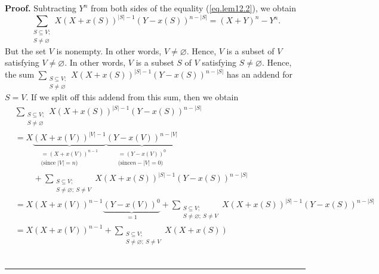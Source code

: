 \documentclass[numbers=enddot,12pt,final,onecolumn,notitlepage]{scrartcl}%
\theoremstyle{definition}
\newenvironment{proof}[1][Proof]{\noindent\textbf{#1.} }{\ \rule{0.5em}{0.5em}}
\let\sumnonlimits\sum
\renewcommand{\sum}{\sumnonlimits\limits}
\newenvironment{verlong}{}{}
\begin{document}
\begin{verlong}
\begin{proof}
Subtracting $Y^{n}$ from both sides of the equality (\ref{eq.lem12.2}), we
obtain%
\begin{equation}
\sum_{\substack{S\subseteq V;\\S\neq\varnothing}}X\left(  X+x\left(  S\right)
\right)  ^{\left\vert S\right\vert -1}\left(  Y-x\left(  S\right)  \right)
^{n-\left\vert S\right\vert }=\left(  X+Y\right)  ^{n}-Y^{n}.
\label{pf.lem.4.4}%
\end{equation}
But the set $V$ is nonempty. In other words, $V\neq\varnothing$. Hence, $V$ is
a subset of $V$ satisfying $V\neq\varnothing$. In other words, $V$ is a subset
$S$ of $V$ satisfying $S\neq\varnothing$. Hence, the sum $\sum
_{\substack{S\subseteq V;\\S\neq\varnothing}}X\left(  X+x\left(  S\right)
\right)  ^{\left\vert S\right\vert -1}\left(  Y-x\left(  S\right)  \right)
^{n-\left\vert S\right\vert }$ has an addend for $S=V$. If we split off this
addend from this sum, then we obtain%
\begin{align*}
&  \sum_{\substack{S\subseteq V;\\S\neq\varnothing}}X\left(  X+x\left(
S\right)  \right)  ^{\left\vert S\right\vert -1}\left(  Y-x\left(  S\right)
\right)  ^{n-\left\vert S\right\vert }\\
&  =X\underbrace{\left(  X+x\left(  V\right)  \right)  ^{\left\vert
V\right\vert -1}}_{\substack{=\left(  X+x\left(  V\right)  \right)
^{n-1}\\\text{(since }\left\vert V\right\vert =n\text{)}}}\underbrace{\left(
Y-x\left(  V\right)  \right)  ^{n-\left\vert V\right\vert }}%
_{\substack{=\left(  Y-x\left(  V\right)  \right)  ^{0}\\\text{(since
}n-\left\vert V\right\vert =0\text{)}}}\\
&  \ \ \ \ \ \ \ \ \ \ +\sum_{\substack{S\subseteq V;\\S\neq\varnothing
;\ S\neq V}}X\left(  X+x\left(  S\right)  \right)  ^{\left\vert S\right\vert
-1}\left(  Y-x\left(  S\right)  \right)  ^{n-\left\vert S\right\vert }\\
&  =X\left(  X+x\left(  V\right)  \right)  ^{n-1}\underbrace{\left(
Y-x\left(  V\right)  \right)  ^{0}}_{=1}+\sum_{\substack{S\subseteq
V;\\S\neq\varnothing;\ S\neq V}}X\left(  X+x\left(  S\right)  \right)
^{\left\vert S\right\vert -1}\left(  Y-x\left(  S\right)  \right)
^{n-\left\vert S\right\vert }\\
&  =X\left(  X+x\left(  V\right)  \right)  ^{n-1}+\sum_{\substack{S\subseteq
V;\\S\neq\varnothing;\ S\neq V}}X\left(  X+x\left(  S\right)  \right)

\end{align*}
\end{proof}
\end{verlong}
\end{document}
